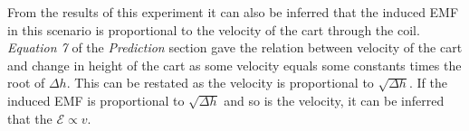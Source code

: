 \documentclass[12pt,letterpaper]{article}
\begin{document}
\noindent From the results of this experiment it can also be inferred that the induced EMF in this scenario is proportional to the velocity of the cart through the coil. \textit{Equation 7} of the \textit{Prediction} section gave the relation between velocity of the cart and change in height of the cart as some velocity equals some constants times the root of $\Delta h$. This can be restated as the velocity is proportional to $\sqrt{\Delta h}$. If the induced EMF is proportional to $\sqrt{\Delta h}$ and so is the velocity, it can be inferred that the $\mathcal{E}\propto v$.
\end{document}
